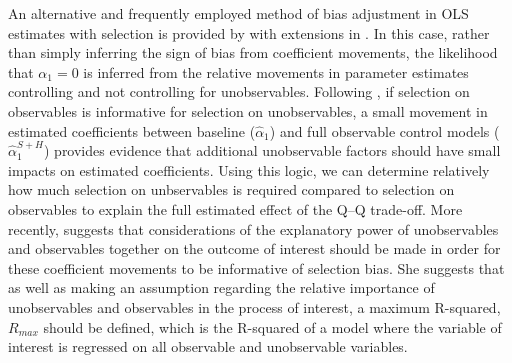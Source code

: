 \documentclass[subeqn]{article}
\begin{document}
\begin{spacing}{1.4}
An alternative and frequently employed method of bias adjustment in OLS estimates with selection is provided by \citet{Altonjietal2005} with extensions in \citet{Oster2013}.  In this case, rather than simply inferring the sign of bias from coefficient movements, the likelihood that $\alpha_1=0$ is inferred from the relative movements in parameter estimates controlling and not controlling for unobservables.  Following \citet{Altonjietal2005}, if selection on observables is informative for selection on unobservables, a small movement in estimated coefficients between baseline ($\hat\alpha_1$) and full observable control models ($\hat\alpha_1^{S+H}$) provides evidence that additional unobservable factors should have small impacts on estimated coefficients.  Using this logic, we can determine relatively how much selection on unbservables is required compared to selection on observables to explain the full estimated effect of the Q--Q trade-off.  More recently, \citet{Oster2013} suggests that considerations of the explanatory power of unobservables and observables together on the outcome of interest should be made in order for these coefficient movements to be informative of selection bias.  She suggests that as well as making an assumption regarding the relative importance of unobservables and observables in the process of interest, a maximum R-squared, $R_{max}$ should be defined, which is the R-squared of a model where the variable of interest is regressed on all observable and unobservable variables.


\end{spacing}
\end{document}
